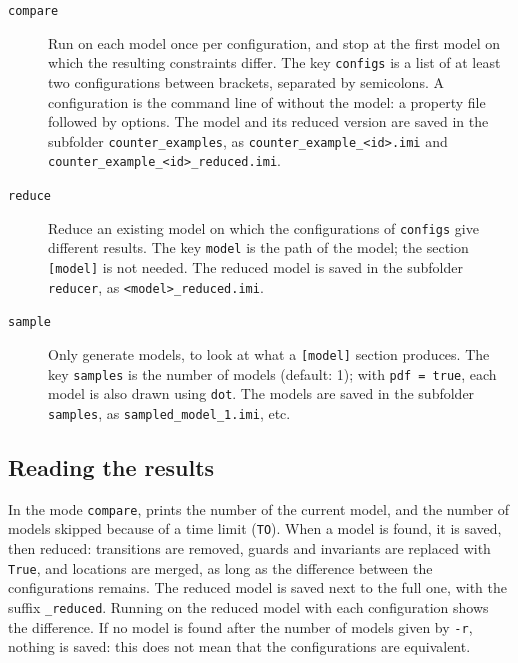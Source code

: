 \begin{description}
	\item[\texttt{compare}]
		Run \imitator{} on each model once per configuration, and stop at the first model on which the resulting constraints differ.
		The key \texttt{configs} is a list of at least two configurations between brackets, separated by semicolons.
		A configuration is the command line of \imitator{} without the model: a property file followed by options.
		The model and its reduced version are saved in the subfolder \texttt{counter\_examples}, as \texttt{counter\_example\_<id>.imi} and \texttt{counter\_example\_<id>\_reduced.imi}.

	\item[\texttt{reduce}]
		Reduce an existing model on which the configurations of \texttt{configs} give different results.
		The key \texttt{model} is the path of the model; the section \texttt{[model]} is not needed.
		The reduced model is saved in the subfolder \texttt{reducer}, as \texttt{<model>\_reduced.imi}.

	\item[\texttt{sample}]
		Only generate models, to look at what a \texttt{[model]} section produces.
		The key \texttt{samples} is the number of models (default: 1); with \texttt{pdf = true}, each model is also drawn using \texttt{dot}.
		The models are saved in the subfolder \texttt{samples}, as \texttt{sampled\_model\_1.imi}, etc.
\end{description}

\subsection{Reading the results}

In the mode \texttt{compare}, \validator{} prints the number of the current model, and the number of models skipped because of a time limit (\texttt{TO}).
When a model is found, it is saved, then reduced: transitions are removed, guards and invariants are replaced with \texttt{True}, and locations are merged, as long as the difference between the configurations remains.
The reduced model is saved next to the full one, with the suffix \texttt{\_reduced}.
Running \imitator{} on the reduced model with each configuration shows the difference.
If no model is found after the number of models given by \texttt{-r}, nothing is saved: this does not mean that the configurations are equivalent.

